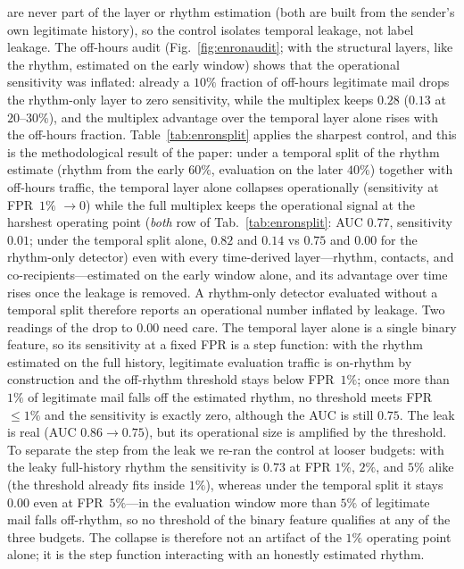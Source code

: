 \documentclass[conference]{IEEEtran}
\begin{document}
are never part of the layer or rhythm estimation (both are built from the sender's own legitimate
history), so the control isolates temporal leakage, not label leakage.
The off-hours audit (Fig.~\ref{fig:enronaudit}; with the structural layers, like the rhythm, estimated on
the early window) shows that the operational sensitivity was inflated: already a $10\%$ fraction of
off-hours legitimate mail drops the rhythm-only layer to zero sensitivity, while the multiplex keeps
$0.28$ ($0.13$ at $20$--$30\%$), and the multiplex
advantage over the temporal layer alone rises with the off-hours fraction. Table~\ref{tab:enronsplit} applies
the sharpest control, and this is the methodological result of the paper: under a temporal split of the
rhythm estimate (rhythm from the early $60\%$, evaluation on the later $40\%$) together with off-hours
traffic, the temporal layer alone collapses operationally (sensitivity at FPR~$1\%$ $\to 0$) while the full
multiplex keeps the operational signal at the harshest operating point (\emph{both} row of
Tab.~\ref{tab:enronsplit}: AUC $0.77$, sensitivity $0.01$; under the temporal split alone, $0.82$ and $0.14$
vs $0.75$ and $0.00$ for the rhythm-only detector) even with every time-derived layer---rhythm, contacts,
and co-recipients---estimated on the
early window alone, and its advantage over time rises once the leakage is removed. A rhythm-only detector evaluated without a temporal split therefore reports an operational number
inflated by leakage. Two readings of the drop to $0.00$ need care. The temporal layer alone is a single binary
feature, so its sensitivity at a fixed FPR is a step function: with the rhythm estimated on the full history,
legitimate evaluation traffic is on-rhythm by construction and the off-rhythm threshold stays below FPR~$1\%$;
once more than $1\%$ of legitimate mail falls off the estimated rhythm, no threshold meets FPR~$\le1\%$ and
the sensitivity is exactly zero, although the AUC is still $0.75$. The leak is real (AUC $0.86\!\to\!0.75$),
but its operational size is amplified by the threshold.
To separate the step from the leak we re-ran the
control at looser budgets: with the leaky full-history rhythm the sensitivity is $0.73$ at FPR
$1\%$, $2\%$, and $5\%$ alike (the threshold already fits inside $1\%$), whereas under the temporal split
it stays $0.00$ even at FPR~$5\%$---in the evaluation window more than $5\%$ of legitimate mail falls
off-rhythm, so no threshold of the binary feature qualifies at any of the three budgets. The collapse is
therefore not an artifact of the $1\%$ operating point alone; it is the step function interacting with an
honestly estimated rhythm.
\end{document}
